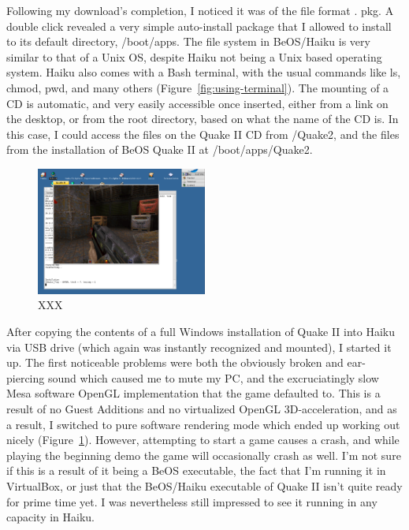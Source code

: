 \documentclass{article}
\newcommand{\figref}[1]{Figure~\ref{fig:#1}}
\begin{document}
Following my download's completion, I noticed it was of the file
format .  pkg.  A double click revealed a very simple auto-install
package that I allowed to install to its default directory,
/boot/apps.  The file system in BeOS/Haiku is very similar to that of
a Unix OS, despite Haiku not being a Unix based operating system.
Haiku also comes with a Bash terminal, with the usual commands like
ls, chmod, pwd, and many others (\figref{using-terminal}).  The
mounting of a CD is automatic, and very easily accessible once
inserted, either from a link on the desktop, or from the root
directory, based on what the name of the CD is.  In this case, I could
access the files on the Quake II CD from /Quake2, and the files from
the installation of BeOS Quake II at /boot/apps/Quake2.

\begin{figure}[h]
\centering
\includegraphics[width=0.5\textwidth]{figs/using-quake-play.png}
\caption{XXX}
\label{fig:using-quake-play}
\end{figure}
	
After copying the contents of a full Windows installation of Quake II
into Haiku via USB drive (which again was instantly recognized and
mounted), I started it up.  The first noticeable problems were both
the obviously broken and ear-piercing sound which caused me to mute my
PC, and the excruciatingly slow Mesa software OpenGL implementation
that the game defaulted to.  This is a result of no Guest Additions
and no virtualized OpenGL 3D-acceleration, and as a result, I switched
to pure software rendering mode which ended up working out nicely
(\figref{using-quake-play}).  However, attempting to start a game
causes a crash, and while playing the beginning demo the game will
occasionally crash as well.  I’m not sure if this is a result of it
being a BeOS executable, the fact that I’m running it in VirtualBox,
or just that the BeOS/Haiku executable of Quake II isn’t quite ready
for prime time yet.  I was nevertheless still impressed to see it
running in any capacity in Haiku.
	
\end{document}
